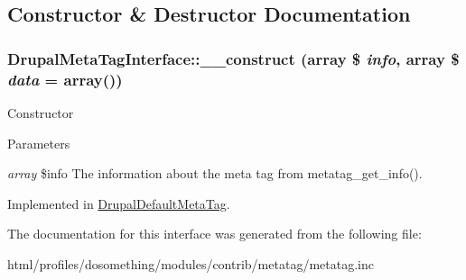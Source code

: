 \subsection{Constructor \& Destructor Documentation}
\hypertarget{interfaceDrupalMetaTagInterface_a21e8f7f5fb413a733c967249da89e8e3}{
\subsubsection[{\_\-\_\-construct}]{\setlength{\rightskip}{0pt plus 5cm}DrupalMetaTagInterface::\_\-\_\-construct (array \$ {\em info}, \/  array \$ {\em data} = {\ttfamily array()})}}
\label{interfaceDrupalMetaTagInterface_a21e8f7f5fb413a733c967249da89e8e3}
Constructor


\begin{DoxyParams}{Parameters}
\item[{\em array}]\$info The information about the meta tag from metatag\_\-get\_\-info(). \end{DoxyParams}


Implemented in \hyperlink{classDrupalDefaultMetaTag_a3d6469bf551465d3925212cfad789597}{DrupalDefaultMetaTag}.

The documentation for this interface was generated from the following file:\begin{DoxyCompactItemize}
\item 
html/profiles/dosomething/modules/contrib/metatag/metatag.inc\end{DoxyCompactItemize}
